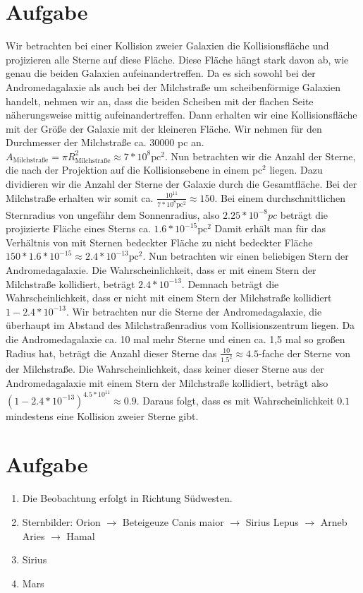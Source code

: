 \documentclass{article}
\begin{document}
	\section{Aufgabe}
	Wir betrachten bei einer Kollision zweier Galaxien die Kollisionsfläche und projizieren alle Sterne auf diese Fläche. Diese Fläche hängt stark davon ab, wie genau die beiden Galaxien aufeinandertreffen. Da es sich sowohl bei der Andromedagalaxie als auch bei der Milchstraße um scheibenförmige Galaxien handelt, nehmen wir an, dass die beiden Scheiben mit der flachen Seite näherungsweise mittig aufeinandertreffen.
	Dann erhalten wir eine Kollisionsfläche mit der Größe der Galaxie mit der kleineren Fläche. Wir nehmen für den Durchmesser der Milchstraße ca. 30000 pc an. $A_{\mathrm{Milchstraße}}=\pi R_{\mathrm{Milchstraße}}^2\approx 7*10^8\mathrm{pc}^2$. Nun betrachten wir die Anzahl der Sterne, die nach der Projektion auf die Kollisionsebene in einem $\mathrm{pc}^2$ liegen. Dazu dividieren wir die Anzahl der Sterne der Galaxie durch die Gesamtfläche. Bei der Milchstraße erhalten wir somit ca. $\frac{10^11}{7*10^8\mathrm{pc}^2}\approx150$.
	Bei einem durchschnittlichen Sternradius von ungefähr dem Sonnenradius, also $2.25*10^{-8} pc$ beträgt die projizierte Fläche eines Sterns ca. $1.6*10^{-15} \mathrm{pc}^2$ Damit erhält man für das Verhältnis von mit Sternen bedeckter Fläche zu nicht bedeckter Fläche $150*1.6*10^{-15} \approx 2.4*10^{-13} \mathrm{pc}^2$. Nun betrachten wir einen beliebigen Stern der Andromedagalaxie. Die Wahrscheinlichkeit, dass er mit einem Stern der Milchstraße kollidiert, beträgt $2.4*10^{-13}$. Demnach beträgt die Wahrscheinlichkeit, dass er nicht mit einem Stern der Milchstraße kollidiert $1-2.4*10^{-13}$. Wir betrachten nur die Sterne der Andromedagalaxie, die überhaupt im Abstand des Milchstraßenradius vom Kollisionszentrum liegen. Da die Andromedagalaxie ca. 10 mal mehr Sterne und einen ca. 1,5 mal so großen Radius hat, beträgt die Anzahl dieser Sterne das $\frac{10}{1.5^2}\approx4.5$-fache der Sterne von der Milchstraße. Die Wahrscheinlichkeit, dass keiner dieser Sterne aus der Andromedagalaxie mit einem Stern der Milchstraße kollidiert, beträgt also $\left(1-2.4*10^{-13}\right)^{4.5*10^11} \approx 0.9$.
	Daraus folgt, dass es mit Wahrscheinlichkeit $0.1$ mindestens eine Kollision zweier Sterne gibt.
	\section{Aufgabe}
	\begin{enumerate}
		\item Die Beobachtung erfolgt in Richtung Südwesten.
		\item Sternbilder:
		\subitem Orion $\to$ Beteigeuze
		\subitem Canis maior $\to$ Sirius
		\subitem Lepus $\to$ Arneb
		\subitem Aries $\to$ Hamal
		\item Sirius
		\item Mars
	\end{enumerate}
\end{document}
